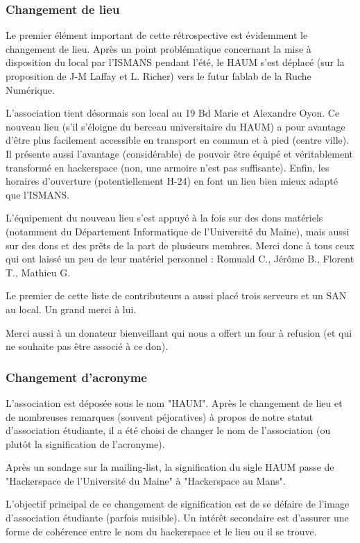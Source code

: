 \documentclass[a4paper, 11pt]{article}
\begin{document}
\subsubsection{Changement de lieu}

Le premier élément important de cette rétrospective est évidemment le changement de lieu.
Après un point problématique concernant la mise à disposition du local par l'ISMANS pendant l'été, le HAUM s'est déplacé (sur la proposition de J-M Laffay et L. Richer) vers le futur fablab de la Ruche Numérique.

L'association tient désormais son local au 19 Bd Marie et Alexandre Oyon. Ce nouveau lieu (s'il s'éloigne du berceau universitaire du HAUM) a pour avantage d'être plus facilement accessible en transport en commun et à pied (centre ville). Il présente aussi l'avantage (considérable) de pouvoir être équipé et véritablement transformé en hackerspace (non, une armoire n'est pas suffisante). Enfin, les horaires d'ouverture (potentiellement H-24) en font un lieu bien mieux adapté que l'ISMANS.

L'équipement du nouveau lieu s'est appuyé à la fois sur des dons matériels (notamment du Département Informatique de l'Université du Maine), mais aussi sur des dons et des prêts de la part de plusieurs membres. Merci donc à tous ceux qui ont laissé un peu de leur matériel personnel : Romuald C., Jérôme B., Florent T., Mathieu G.

Le premier de cette liste de contributeurs a aussi placé trois serveurs et un SAN au local. Un grand merci à lui.

Merci aussi à un donateur bienveillant qui nous a offert un four à refusion (et qui ne souhaite pas être associé à ce don).

\subsubsection{Changement d'acronyme}

L'association est déposée sous le nom "HAUM". Après le changement de lieu et de nombreuses remarques (souvent péjoratives) à propos de notre statut d'association étudiante, il a été choisi de changer le nom de l'association (ou plutôt la signification de l'acronyme).

Après un sondage sur la mailing-list, la signification du sigle HAUM passe de "Hackerspace de l'Université du Maine" à "Hackerspace au Mans".

L'objectif principal de ce changement de signification est de se défaire de l'image d'association étudiante (parfois nuisible). Un intérêt secondaire est d'assurer une forme de cohérence entre le nom du hackerspace et le lieu ou il se trouve.
\end{document}
